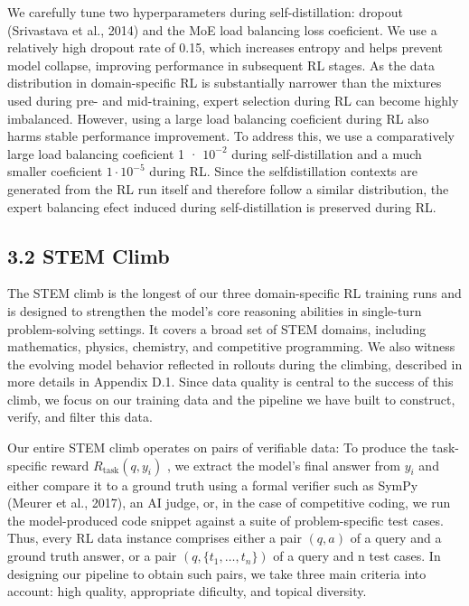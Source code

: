 \documentclass[
  10
]{article}
\begin{document}
We carefully tune two hyperparameters during self-distillation: dropout
(Srivastava et al., 2014) and the MoE load balancing loss coeficient. We
use a relatively high dropout rate of 0.15, which increases entropy and
helps prevent model collapse, improving performance in subsequent RL
stages. As the data distribution in domain-specific RL is substantially
narrower than the mixtures used during pre- and mid-training, expert
selection during RL can become highly imbalanced. However, using a large
load balancing coeficient during RL also harms stable performance
improvement. To address this, we use a comparatively large load
balancing coeficient 1 · \(1 0 ^ { - 2 }\) during self-distillation and
a much smaller coeficient \(1 \cdot 1 0 ^ { - 5 }\) during RL. Since the
selfdistillation contexts are generated from the RL run itself and
therefore follow a similar distribution, the expert balancing efect
induced during self-distillation is preserved during RL.

\subsection{3.2 STEM Climb}\label{stem-climb}

The STEM climb is the longest of our three domain-specific RL training
runs and is designed to strengthen the model's core reasoning abilities
in single-turn problem-solving settings. It covers a broad set of STEM
domains, including mathematics, physics, chemistry, and competitive
programming. We also witness the evolving model behavior reflected in
rollouts during the climbing, described in more details in Appendix D.1.
Since data quality is central to the success of this climb, we focus on
our training data and the pipeline we have built to construct, verify,
and filter this data.

Our entire STEM climb operates on pairs of verifiable data: To produce
the task-specific reward
\(R _ { \mathrm { t a s k } } ( q , y _ { i } )\) , we extract the
model's final answer from \(y _ { i }\) and either compare it to a
ground truth using a formal verifier such as SymPy (Meurer et al.,
2017), an AI judge, or, in the case of competitive coding, we run the
model-produced code snippet against a suite of problem-specific test
cases. Thus, every RL data instance comprises either a pair
\(( q , a )\) of a query and a ground truth answer, or a pair
\(( q , \{ t _ { 1 } , \ldots , t _ { n } \} )\) of a query and n test
cases. In designing our pipeline to obtain such pairs, we take three
main criteria into account: high quality, appropriate dificulty, and
topical diversity.
\end{document}
